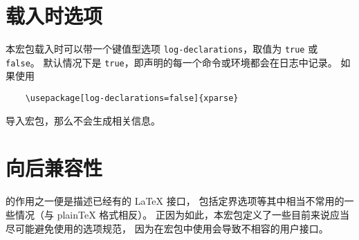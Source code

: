 \documentclass{l3doc}
\begin{document}
%
\section{载入时选项}

%
本宏包载入时可以带一个键值型选项 \texttt{log-declarations}，取值为 \texttt{true} 或 \texttt{false}。
默认情况下是 \texttt{true}，即声明的每一个命令或环境都会在日志中记录。
如果使用
\begin{verbatim}
    \usepackage[log-declarations=false]{xparse}
\end{verbatim}
导入宏包，那么不会生成相关信息。

%
\section{向后兼容性}
\label{sec:backwards}

%
 的作用之一便是描述已经有的 \LaTeX{} 接口，
包括定界选项等其中相当不常用的一些情况（与 plain\TeX{} 格式相反）。
正因为如此，本宏包定义了一些目前来说应当尽可能避免使用的选项规范，
因为在宏包中使用会导致不相容的用户接口。
\end{document}
